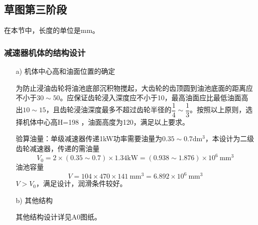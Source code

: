 \subsection{草图第三阶段}
在本节中，长度的单位是mm。
\subsubsection{减速器机体的结构设计}
\begin{itemize}
	\item [a)]机体中心高和油面位置的确定
	\par 为防止浸油齿轮将油池底部沉积物搅起，大齿轮的齿顶圆到油池底面的距离应不小于$30\sim 50$。应保证齿轮浸入深度应不小于10，最高油面应比最低油面高出$10\sim 15$，且齿轮浸油深度最多不超过齿轮半径的$\dfrac{1}{4} \sim \dfrac{1}{3}$。按照以上原则，选择机体中心高H=198 ，油面高度为120，满足以上要求。
    \par 验算油量：单级减速器传递1kW功率需要油量为$0.35\sim 0.7\mathrm{dm^3}$，本设计为二级齿轮减速器，传递的需油量$$V_0=2\times \left(0.35\sim 0.7\right)\times 1.34\mathrm{kW}=\left(0.938\sim 1.876\right)\times 10^6~\mathrm{mm^3}$$
    油池容量$$V=104\times 470\times 141~\mathrm{mm^3}=6.892\times 10^6~\mathrm{mm^3}$$
    $V>V_0$，满足设计，润滑条件较好。
    
    \item[b)] 其他结构
    \par 其他结构设计详见A0图纸。
\end{itemize}
